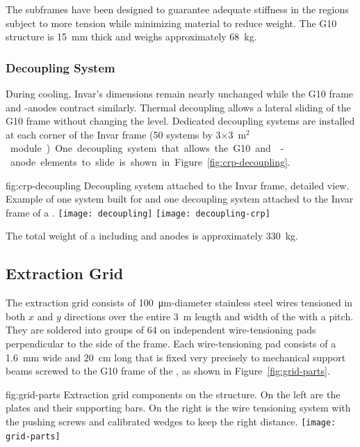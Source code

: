 The subframes have been designed to guarantee  
adequate stiffness in the  regions subject to more tension while minimizing material to reduce weight.
The G10 structure is \SI{15}{mm} thick and weighs approximately \SI{68}{kg}. 

\subsubsection{Decoupling System}
 
During cooling, Invar's dimensions remain nearly unchanged while the G10 frame and -anodes contract similarly. Thermal decoupling allows a lateral sliding of the G10 frame without changing the level. 
Dedicated decoupling systems are installed at each corner of the Invar frame (\num{50} systems by  \num{3}$\times$\SI{3}{m$^{2}$} module). One decoupling system that allows the G10 and -anode elements to slide is shown in  Figure~\ref{fig:crp-decoupling}.

\begin{dunefigure}{fig:crp-decoupling}
{Decoupling system attached to the Invar frame, detailed view. Example of one system built for  and one decoupling system attached to the Invar frame of a .}
\texttt{[image: decoupling]}
\texttt{[image: decoupling-crp]}
\end{dunefigure}

The total weight of a  including  and anodes is approximately \SI{330}{kg}.

\subsection{Extraction Grid}
\label{sec:fddp-crp-grid}
The extraction grid consists of \SI{100}{\micro\meter}-diameter stainless steel wires tensioned in both $x$ and $y$ directions over the entire \SI{3}{m} length and width of the  with a \dpstrippitch pitch. They are soldered into groups of \num{64} on independent wire-tensioning pads perpendicular to the side of the  frame. Each wire-tensioning pad consists of a  \SI{1.6}{mm} wide and \SI{20}{cm} long that is fixed very precisely to mechanical support beams screwed to the G10 frame of the , as shown in Figure~\ref{fig:grid-parts}.
\begin{dunefigure}{fig:grid-parts}
{Extraction grid components on the  structure. On the left are the  plates and their supporting bars. On the right is the %
wire tensioning system with the pushing screws and calibrated wedges to keep the right distance.}
\texttt{[image: grid-parts]}
\end{dunefigure}

